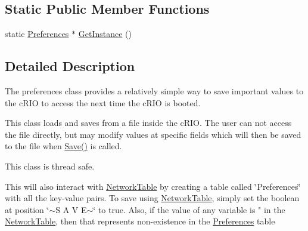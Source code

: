 \subsection*{Static Public Member Functions}
\begin{DoxyCompactItemize}
\item 
static \hyperlink{classPreferences}{Preferences} $\ast$ \hyperlink{classPreferences_aacc16e546a94d54772f3b500ec9a81a0}{GetInstance} ()
\end{DoxyCompactItemize}


\subsection{Detailed Description}
The preferences class provides a relatively simple way to save important values to the cRIO to access the next time the cRIO is booted.

This class loads and saves from a file inside the cRIO. The user can not access the file directly, but may modify values at specific fields which will then be saved to the file when \hyperlink{classPreferences_ae8ce1d8967e205e584e9cca1dbf86919}{Save()} is called.

This class is thread safe.

This will also interact with \hyperlink{classNetworkTable}{NetworkTable} by creating a table called \char`\"{}Preferences\char`\"{} with all the key-\/value pairs. To save using \hyperlink{classNetworkTable}{NetworkTable}, simply set the boolean at position \char`\"{}$\sim$S A V E$\sim$\char`\"{} to true. Also, if the value of any variable is " in the \hyperlink{classNetworkTable}{NetworkTable}, then that represents non-\/existence in the \hyperlink{classPreferences}{Preferences} table 

